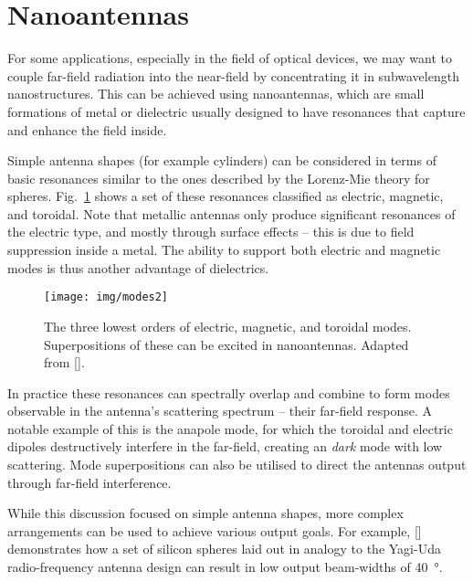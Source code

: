 \documentclass[12pt,a4paper]{article}
\newcommand{\citein}[1]{[\citen{#1}]}
\begin{document}
\section{Nanoantennas}
For some applications, especially in the field of optical devices, %
we may want to couple far-field radiation into the near-field by concentrating it in subwavelength nanostructures. This can be achieved using nanoantennas, which are small formations of metal or dielectric usually designed to have resonances that capture and enhance the field inside\cite{krasnokAlldielectricOpticalNanoantennas2012}.

Simple antenna shapes (for example cylinders) can be considered in terms of basic resonances similar to the ones described by the Lorenz-Mie theory for spheres\cite{sainNonlinearOpticsAlldielectric2019}. Fig.~\ref{fig:modes2} shows a set of these resonances classified as electric, magnetic, and toroidal. Note that metallic antennas only produce significant resonances of the electric type, and mostly through surface effects\cite{kuznetsovOpticallyResonantDielectric2016} -- this is due to field suppression inside a metal. The ability to support both electric and magnetic modes is thus another advantage of dielectrics.
\begin{figure}[h]
	\centering
	\texttt{[image: img/modes2]}
	\caption{The three lowest orders of electric, magnetic, and toroidal modes. Superpositions of these can be excited in nanoantennas. Adapted from \citein{savinovToroidalDipolarExcitation2014}.}
	\label{fig:modes2}
\end{figure}

In practice these resonances can spectrally overlap and combine to form modes observable in the antenna's scattering spectrum -- their far-field response. A notable example of this is the anapole mode, for which the toroidal and electric dipoles destructively interfere in the far-field, creating an \emph{dark} mode with low scattering\cite{grinblatEnhancedThirdHarmonic2016}. Mode superpositions can also be utilised to direct the antennas output through far-field interference.

While this discussion focused on simple antenna shapes, more complex arrangements can be used to achieve various output goals. For example, \citein{krasnokAlldielectricOpticalNanoantennas2012} demonstrates how a set of silicon spheres laid out in analogy to the Yagi-Uda radio-frequency antenna design can result in low output beam-widths of \SI{40}{\degree}.
\end{document}
